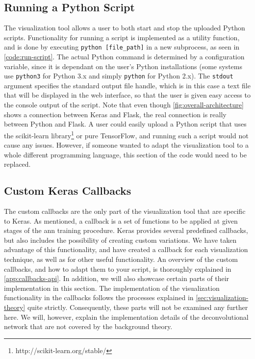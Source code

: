 \subsection{Running a Python Script}

The visualization tool allows a user to both start and stop the uploaded Python scripts. Functionality for running a script is implemented as a utility function, and is done by executing \texttt{python [file\_path]} in a new subprocess, as seen in \autoref{code:run-script}. The actual Python command is determined by a configuration variable, since it is dependant on the user's Python installations (some systems use \texttt{python3} for Python 3.x and simply \texttt{python} for Python 2.x). The \texttt{stdout} argument specifies the standard output file handle, which is in this case a text file that will be displayed in the web interface, so that the user is given easy access to the console output of the script. Note that even though \autoref{fig:overall-architecture} shows a connection between Keras and Flask, the real connection is really between Python and Flask. A user could easily upload a Python script that uses the scikit-learn library\footnote{http://scikit-learn.org/stable/} or pure TensorFlow, and running such a script would not cause any issues. However, if someone wanted to adapt the visualization tool to a whole different programming language, this section of the code would need to be replaced.


\subsection{Custom Keras Callbacks}

The custom callbacks are the only part of the visualization tool that are specific to Keras. As mentioned, a callback is a set of functions to be applied at given stages of the \acrshort{ann} training procedure. Keras provides several predefined callbacks, but also includes the possibility of creating custom variations. We have taken advantage of this functionality, and have created a callback for each visualization technique, as well as for other useful functionality. An overview of the custom callbacks, and how to adapt them to your script, is thoroughly explained in \autoref{app:callbacks-api}. In addition, we will also showcase certain parts of their implementation in this section. The implementation of the visualization functionality in the callbacks follows the processes explained in \autoref{sec:visualization-theory} quite strictly. Consequently, these parts will not be examined any further here. We will, however, explain the implementation details of the deconvolutional network that are not covered by the background theory. 


